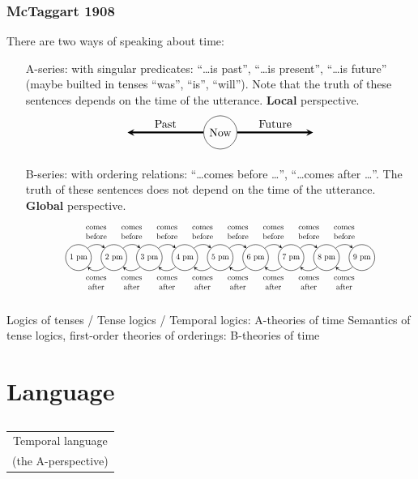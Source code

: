 \documentclass[xcolor=x11names]{beamer}
\makeatletter
\let\beamer@writeslidentry@miniframeson=\beamer@writeslidentry
\def\beamer@writeslidentry@miniframesoff{%
  \expandafter\beamer@ifempty\expandafter{\beamer@framestartpage}{}%
  {%
    \clearpage\beamer@notesactions%
  }
}
\newcommand*{\miniframeson}{\let\beamer@writeslidentry=\beamer@writeslidentry@miniframeson}
\newcommand*{\miniframesoff}{\let\beamer@writeslidentry=\beamer@writeslidentry@miniframesoff}
\newcommand{\cimdia}[1] {\miniframesoff \begin{frame}\begin{center}\huge \begin{tabular}{c}#1\end{tabular}\end{center}\end{frame}\miniframeson}
\newcommand{\szakasz}[2][]{\section{#1}\subsection{}\cimdia{#2}}
\renewcommand{\emph}[1]{\textbf{#1}}
\makeatother
\begin{document}
\begin{frame}%
	\frametitle{McTaggart 1908}
\footnotesize
There are two ways of speaking about time:
\begin{itemize}
\item[A-series:] with singular predicates: ``\dots is past'', ``\dots is present'', ``\dots is future'' (maybe builted in tenses ``was'', ``is'', ``will''). Note that the truth of these sentences depends on the time of the utterance. \emph{Local} perspective.
    \[\begin{tikzpicture}[>=stealth]
    \node(now)[circle, draw=black] at (0,0) {Now};
    \node(future) at (3,0) {};
    \node(past) at (-3,0) {};
    \draw[->, ultra thick] (now)--(future) node[midway, above]{Future};
    \draw[->, ultra thick] (now)--(past) node[midway, above]{Past};
    \end{tikzpicture}\]
\item[B-series:] with ordering relations: ``\dots comes before \dots'', ``\dots comes after \dots''. The truth of these sentences does not depend on the time of the utterance. \emph{Global} perspective.
    \[\begin{tikzpicture}[>=stealth]
    \foreach \i in {1, 2, ..., 9}
    {\node[scale=.7](\i)[circle, draw=black] at (1.1*\i,0) {\i~pm};}
    \foreach \i in {1, 2, ..., 8}
    {\pgfmathtruncatemacro{\j}{\i + 1}
    \draw[->](\i) edge[out=45, in=135]node[midway, above, scale=.7]{\begin{tabular}c comes \\ before\end{tabular}} (\j) ;
    \draw[->](\j) edge[out=-135, in=-45]node[midway, below, scale=.7]{\begin{tabular}c comes \\ after\end{tabular}} (\i) ;}
    \end{tikzpicture}\]

\end{itemize}

\bigskip

         Logics of tenses / Tense logics / Temporal logics: A-theories of time
\newline Semantics of tense logics, first-order theories of orderings: B-theories of time

\end{frame}

\szakasz[Language]{Temporal language \\[2em] (the A-perspective)}
\end{document}
